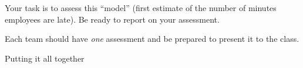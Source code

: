 \hfill


Your task is to assess this ``model'' (first estimate of the number of minutes employees are late). Be ready to report on your assessment.

\begin{teamwork}
Each team should have \emph{one} assessment and be prepared to present it to the class.	
\end{teamwork}



















\standardonlynewpage


%
%



\begin{module}{Putting it all together}
	\label{report}

	
	
\end{module}



%
%
%	
%
%







